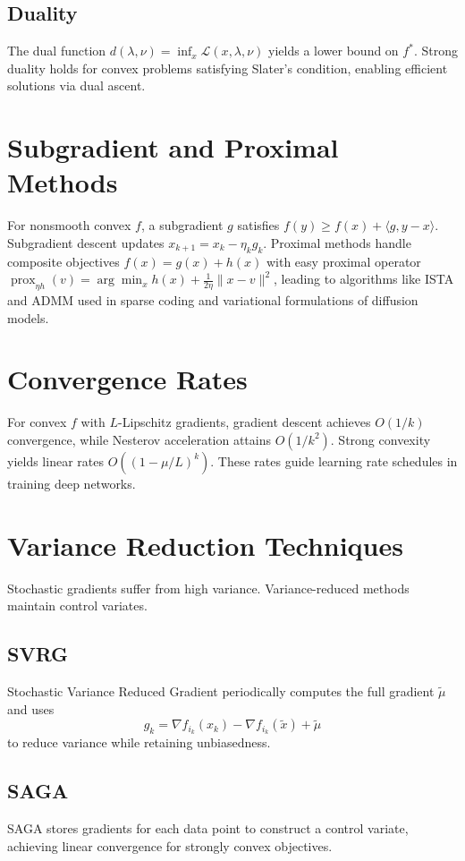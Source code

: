 \documentclass[11pt]{book}
\begin{document}
\subsection{Duality}
The dual function $d(\lambda,\nu)=\inf_x \mathcal{L}(x,\lambda,\nu)$ yields a lower bound on $f^*$. Strong duality holds for convex problems satisfying Slater's condition, enabling efficient solutions via dual ascent.

\section{Subgradient and Proximal Methods}
For nonsmooth convex $f$, a subgradient $g$ satisfies $f(y)\ge f(x)+\langle g,y-x\rangle$. Subgradient descent updates $x_{k+1}=x_k-\eta_k g_k$. Proximal methods handle composite objectives $f(x)=g(x)+h(x)$ with easy proximal operator $\operatorname{prox}_{\eta h}(v)=\arg\min_x h(x)+\tfrac1{2\eta}\|x-v\|^2$, leading to algorithms like ISTA and ADMM used in sparse coding and variational formulations of diffusion models.

\section{Convergence Rates}
For convex $f$ with $L$-Lipschitz gradients, gradient descent achieves $O(1/k)$ convergence, while Nesterov acceleration attains $O(1/k^2)$. Strong convexity yields linear rates $O((1-\mu/L)^k)$. These rates guide learning rate schedules in training deep networks.

\section{Variance Reduction Techniques}
Stochastic gradients suffer from high variance. Variance-reduced methods maintain control variates.
\subsection{SVRG \cite{johnson2013}}
Stochastic Variance Reduced Gradient periodically computes the full gradient $\tilde{\mu}$ and uses
\begin{equation}
g_k=\nabla f_{i_k}(x_k)-\nabla f_{i_k}(\tilde{x})+\tilde{\mu}
\end{equation}
to reduce variance while retaining unbiasedness.
\subsection{SAGA \cite{defazio2014}}
SAGA stores gradients for each data point to construct a control variate, achieving linear convergence for strongly convex objectives.
\end{document}
